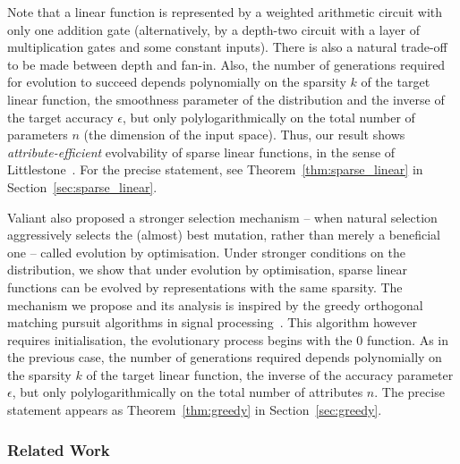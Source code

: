 Note that a linear function is represented by a weighted arithmetic circuit with
only one addition gate (alternatively, by a depth-two circuit with a layer of
multiplication gates and some constant inputs). There is also a natural
trade-off to be made between depth and fan-in.
Also, the number of generations
required for evolution to succeed depends polynomially on the sparsity $k$ of the
target linear function, the smoothness parameter of the distribution and the
inverse of the target accuracy $\epsilon$, but only polylogarithmically on the
total number of parameters $n$ (the dimension of the input space). Thus, our
result shows \emph{attribute-efficient} evolvability of sparse linear functions,
in the sense of Littlestone~\cite{Littlestone:1988}.  For the precise statement,
see Theorem~\ref{thm:sparse_linear} in Section~\ref{sec:sparse_linear}.

Valiant also proposed a stronger selection mechanism -- when natural selection
aggressively selects the (almost) best mutation, rather than merely a beneficial
one -- called evolution by optimisation.  Under stronger conditions on the
distribution, we show that under evolution by optimisation, sparse linear
functions can be evolved by representations with the same sparsity. The
mechanism we propose and its analysis is inspired by the greedy orthogonal
matching pursuit algorithms in signal
processing~\cite{Donoho:2006-recovery,Tropp:2004-greed}. This algorithm however
requires initialisation, \ie the evolutionary process begins with the $0$
function. As in the previous case, the number of generations required depends
polynomially on the sparsity $k$ of the target linear function, the inverse of
the accuracy parameter $\epsilon$, but only polylogarithmically on the total
number of attributes $n$. The precise statement appears as
Theorem~\ref{thm:greedy} in Section~\ref{sec:greedy}.

\subsubsection*{Related Work}

